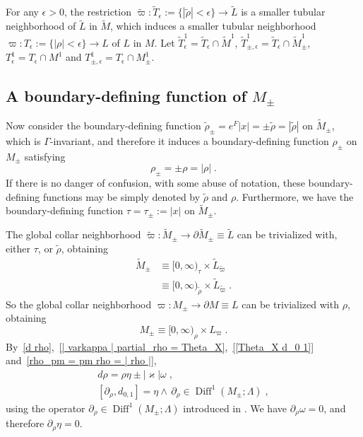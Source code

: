 \documentclass{memo-l}
\theoremstyle{plain}
\theoremstyle{definition}
\theoremstyle{remark}
\newcommand{\Diff}{\operatorname{Diff}}
\numberwithin{section}{chapter}
\numberwithin{equation}{section}%
\begin{document}
For any $\epsilon>0$, the restriction $\widetilde\varpi:\widetilde T_\epsilon:=\{|\tilde\rho|<\epsilon\}\to\widetilde L$ is a smaller tubular neighborhood of $\widetilde L$ in $\widetilde M$, which induces a smaller tubular neighborhood $\varpi:T_\epsilon:=\{|\rho|<\epsilon\}\to L$ of $L$ in $M$. Let $\widetilde T^1_\epsilon=\widetilde T_\epsilon\cap\widetilde M^1$, $\widetilde T^1_{\pm,\epsilon}=\widetilde T_{\epsilon}\cap\widetilde M^1_\pm$, $T^1_\epsilon=T_\epsilon\cap M^1$ and $T^1_{\pm,\epsilon}=T_\epsilon\cap M^1_\pm$.



\subsection{A boundary-defining function of $M_\pm$}\label{ss: boundary-def func of M_pm - suspension}

Now consider the boundary-defining function $\tilde\rho_\pm=e^F|x|=\pm\tilde\rho=|\tilde\rho|$ on $\widetilde M_\pm$, which is $\Gamma$-invariant, and therefore it induces a boundary-defining function $\rho_\pm$ on $M_\pm$ satisfying
\begin{equation}\label{rho_pm = pm rho = | rho |}
\rho_\pm=\pm\rho=|\rho|\;.
\end{equation}
If there is no danger of confusion, with some abuse of notation, these boundary-defining functions may be simply denoted by $\tilde\rho$ and $\rho$. Furthermore, we have the boundary-defining function $\tau=\tau_\pm:=|x|$ on $\widetilde M_\pm$.

The global collar neighborhood $\widetilde\varpi:\widetilde M_\pm\to\partial\widetilde M_\pm\equiv\widetilde L$ can be trivialized with, either $\tau$, or $\tilde\rho$, obtaining
\begin{align}
\widetilde M_\pm&\equiv[0,\infty)_\tau\times\widetilde L_{\widetilde\varpi}
\label{widetilde M_pm equiv [0 infty)_tau times widetilde L_varpi}\\
&\equiv[0,\infty)_{\tilde\rho}\times\widetilde L_{\widetilde\varpi}\;.
\label{widetilde M_pm equiv [0 infty)_tilde rho times widetilde L_varpi}
\end{align}
So the global collar neighborhood $\varpi:M_\pm\to\partial M\equiv L$ can be trivialized with $\rho$, obtaining
\begin{equation}\label{M_pm equiv [0 infty)_rho times L_varpi}
M_\pm\equiv[0,\infty)_\rho\times L_\varpi\;.
\end{equation}
By~\eqref{d rho},~\eqref{| varkappa | partial_rho = Theta_X},~\eqref{[Theta_X d_0 1]} and~\eqref{rho_pm = pm rho = | rho |},
\begin{gather}
d\rho=\rho\eta\pm|\varkappa|\omega\;,\label{d rho_pm}\\
[\partial_\rho,d_{0,1}]={\eta\wedge}\,\partial_\rho\in\Diff^1(M_\pm;\Lambda)\;,\label{[partial_rho d_0 1]}
\end{gather}
using the operator $\partial_\rho\in\Diff^1(M_\pm;\Lambda)$ introduced in . We have $\partial_\rho\omega=0$, and therefore $\partial_\rho\eta=0$.
\end{document}
